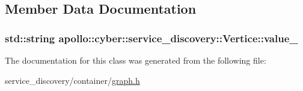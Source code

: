 \subsection{Member Data Documentation}
\hypertarget{classapollo_1_1cyber_1_1service__discovery_1_1Vertice_abea15ca509a3aa321afabf5b5c3ab8ba}{
\subsubsection[{value\-\_\-}]{\setlength{\rightskip}{0pt plus 5cm}std\-::string apollo\-::cyber\-::service\-\_\-discovery\-::\-Vertice\-::value\-\_\-\hspace{0.3cm}{\ttfamily [private]}}}\label{classapollo_1_1cyber_1_1service__discovery_1_1Vertice_abea15ca509a3aa321afabf5b5c3ab8ba}


The documentation for this class was generated from the following file\-:\begin{DoxyCompactItemize}
\item 
service\-\_\-discovery/container/\hyperlink{graph_8h}{graph.\-h}\end{DoxyCompactItemize}
